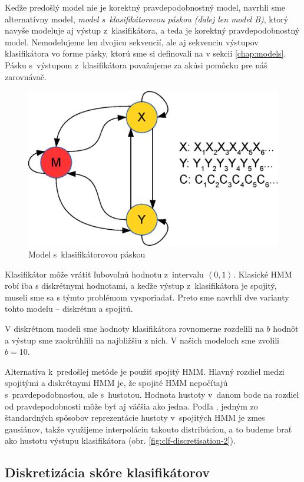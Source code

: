Keďže predošlý model nie je korektný pravdepodobnostný model, navrhli sme alternatívny model, \textit{model s~klasifikátorovou páskou (ďalej len model B)}, ktorý navyše modeluje aj výstup z~klasifikátora, a teda je korektný pravdepodobnostný model.
Nemodelujeme len dvojicu sekvencií, ale aj sekvenciu výstupov klasifikátora vo forme pásky, ktorú sme si definovali na v sekcii \ref{chap:models}.
Pásku s~výstupom z~klasifikátora považujeme za akúsi pomôcku pre náš zarovnávač.
\begin{figure}[htp]
    \centering
    \includegraphics[width=.5\textwidth]{images/model_clf_paska}
    \caption{Model s~klasifikátorovou páskou}
\end{figure}
Klasifikátor môže vrátiť ľubovoľnú hodnotu z~intervalu $\left<0,1 \right>$. Klasické HMM robí iba s diskrétnymi hodnotami, a keďže výstup z~klasifikátora je spojitý, museli sme sa s týmto problémom vysporiadať. Preto sme navrhli dve varianty tohto modelu -- diskrétnu a spojitú.

V diskrétnom modeli sme hodnoty klasifikátora rovnomerne rozdelili na $b$ hodnôt a výstup sme zaokrúhlili na najbližšiu z nich. V našich modeloch sme zvolili $b=10$.

Alternatíva k~predošlej metóde je použiť spojitý HMM. Hlavný rozdiel medzi spojitými a diskrétnymi HMM je, že spojité HMM nepočítajú s~pravdepodobnosťou, ale s~hustotou. Hodnota hustoty v~danom bode na rozdiel od pravdepodobnosti môže byť aj väčšia ako jedna. Podľa  \cite{huang1989multiple}, jedným zo štandardných spôsobov reprezentácie hustoty v~spojitých HMM je zmes gausiánov, takže využijeme interpoláciu takouto distribúciou, a to budeme brať ako hustotu výstupu klasifikátora (obr. \ref{fig:clf-discretisation-2}).



\subsection{Diskretizácia skóre klasifikátorov}

